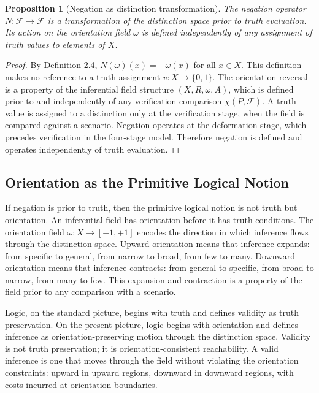 \documentclass[12pt]{article}
\newtheorem{proposition}[theorem]{Proposition}
\theoremstyle{remark}
\begin{document}
\begin{proposition}[Negation as distinction transformation]
\label{prop:neg-distinction}
The negation operator $N : \mathcal{F} \to \mathcal{F}$ is a
transformation of the distinction space prior to truth evaluation. Its
action on the orientation field $\omega$ is defined independently of any
assignment of truth values to elements of $X$.
\end{proposition}

\begin{proof}
By Definition 2.4, $N(\omega)(x) = -\omega(x)$ for all $x \in X$.
This definition makes no reference to a truth assignment $v : X \to
\{0,1\}$. The orientation reversal is a property of the inferential
field structure $(X, R, \omega, A)$, which is defined prior to and
independently of any verification comparison $\chi(P, \mathcal{F})$. A
truth value is assigned to a distinction only at the verification stage,
when the field is compared against a scenario. Negation operates at the
deformation stage, which precedes verification in the four-stage model.
Therefore negation is defined and operates independently of truth
evaluation.
\end{proof}

\subsection{Orientation as the Primitive Logical Notion}

If negation is prior to truth, then the primitive logical notion is not
truth but orientation. An inferential field has orientation before it
has truth conditions. The orientation field $\omega : X \to [-1, +1]$
encodes the direction in which inference flows through the distinction
space. Upward orientation means that inference expands: from specific to
general, from narrow to broad, from few to many. Downward orientation
means that inference contracts: from general to specific, from broad to
narrow, from many to few. This expansion and contraction is a property
of the field prior to any comparison with a scenario.

Logic, on the standard picture, begins with truth and defines validity
as truth preservation. On the present picture, logic begins with
orientation and defines inference as orientation-preserving motion
through the distinction space. Validity is not truth preservation; it
is orientation-consistent reachability. A valid inference is one that
moves through the field without violating the orientation constraints:
upward in upward regions, downward in downward regions, with costs
incurred at orientation boundaries.
\end{document}
